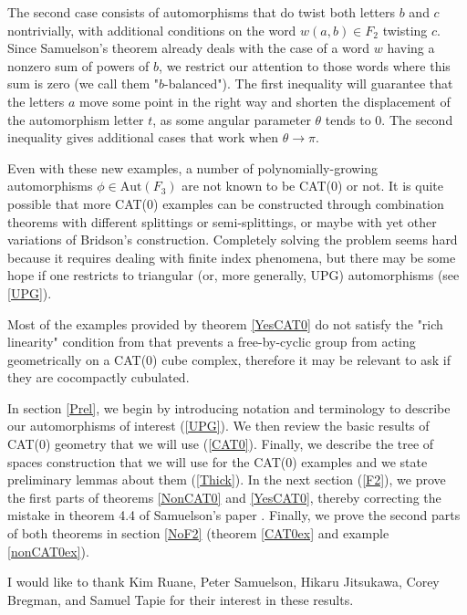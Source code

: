 \documentclass  [a4paper, 11pts] {article}
\newcommand{\Aut}{{\mathrm{Aut}}}
\begin{document}
The second case consists of automorphisms that do twist both letters $b$ and $c$ nontrivially, with additional conditions on the word $w(a, b)\in F_2$ twisting $c$. Since Samuelson's theorem already deals with the case of a word $w$ having a nonzero sum of powers of $b$, we restrict our attention to those words where this sum is zero (we call them "$b$-balanced"). The first inequality will guarantee that the letters $a$ move some point in the right way and shorten the displacement of the automorphism letter $t$, as some angular parameter $\theta$ tends to $0$. The second inequality gives additional cases that work when $\theta \longrightarrow \pi$.



Even with these new examples, a number of polynomially-growing automorphisms $\phi\in \Aut(F_3)$ are not known to be CAT(0) or not. It is quite possible that more CAT(0) examples can be constructed through combination theorems with different splittings or semi-splittings, or maybe with yet other variations of Bridson's construction. Completely solving the problem seems hard because it requires dealing with finite index phenomena, but there may be some hope if one restricts to triangular (or, more generally, UPG) automorphisms (see \ref{UPG}).

Most of the examples provided by theorem \ref{YesCAT0} do not satisfy the "rich linearity" condition from \cite{MP25} that prevents a free-by-cyclic group from acting geometrically on a CAT(0) cube complex, therefore it may be relevant to ask if they are cocompactly cubulated.

In section \ref{Prel}, we begin by introducing notation and terminology to describe our automorphisms of interest (\ref{UPG}). We then review the basic results of CAT(0) geometry that we will use (\ref{CAT0}). Finally, we describe the tree of spaces construction that we will use for the CAT(0) examples and we state preliminary lemmas about them (\ref{Thick}). In the next section (\ref{F2}), we prove the first parts of theorems \ref{NonCAT0} and \ref{YesCAT0}, thereby correcting the mistake in theorem 4.4 of Samuelson's paper \cite{Sam06}. Finally, we prove the second  parts of both theorems in section \ref{NoF2} (theorem \ref{CAT0ex} and example \ref{nonCAT0ex}).

I would like to thank Kim Ruane, Peter Samuelson, Hikaru Jitsukawa, Corey Bregman, and Samuel Tapie for their interest in these results.
\end{document}
